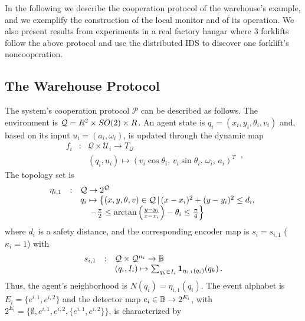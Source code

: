 \documentclass[journal, onecolumn, 12pt]{styles/IEEEtran}
\begin{document}
In the following we describe the cooperation protocol of the warehouse's example, and we exemplify the construction of the local monitor and of its operation. We also present results from experiments in a real factory hangar where $3$ forklifts follow the above protocol and use the distributed IDS to discover one forklift's noncooperation.

\subsection{The Warehouse Protocol}

The system's cooperation protocol $\mathcal{P}$ can be described as
follows. The environment is $\mathcal{Q} = R^2 \times SO(2) \times R$. An agent
state is $q_i = (x_i, y_i, \theta_i, v_i)$ and, based on its
input $u_i=(a_i, \omega_i)$, is updated through the dynamic map
\begin{equation*}
\label{eq:example:dynamics}
\begin{array}{rcl}
f_i & : & \mathcal{Q} \times \mathcal{U}_i \rightarrow T_\mathcal{Q} \\
& & (q_i, u_i) \mapsto \left(v_i \cos \theta_i, \, v_i \sin \theta_i, \,\omega_i , \, a_i \right)^T
\end{array} \, ,
\end{equation*}
The topology set is 
\begin{equation*}
\begin{array}{rcl}
\eta_{i,1} & : & \mathcal{Q} \rightarrow 2^{\mathcal{Q}} \\
& & q_i \mapsto \left\lbrace (x,y,\theta, v) \in \mathcal{Q} \, | \, (x-x_i)^2+(y-y_i)^2 \leq d_i, \right. \\
& & \;\;\;\; \left. -\frac{\pi}{2}  \leq \arctan\left(\frac{y-y_i}{x-x_i}\right)-\theta_i \leq \frac{\pi}{4} \right\rbrace
\end{array}
\end{equation*}
where $d_i$ is a safety distance, and the corresponding encoder map is $s_i = s_{i,1}$ ($\kappa_i=1$) with 
\begin{equation*}
\begin{array}{rcl}
s_{i,1} & : & \mathcal{Q} \times \mathcal{Q}^{n_i} \rightarrow \Bbb{B} \\
& & (q_i, I_i) \mapsto \sum_{q_k \in I_i} {\bf 1}_{\eta_{i,1}(q_i)}(q_k) \, . 
\end{array}
\end{equation*}
Thus, the agent's neighborhood is $N(q_i) = \eta_{i,1}(q_i)$. The event alphabet is $E_i = \{e^{i,1}, e^{i,2}\}$ and the detector map $e_i \in \Bbb{B} \rightarrow 2^{E_i}$, with $2^{E_i} = \{\emptyset, e^{i,1}, e^{i,2}, \{e^{i,1}, e^{i,2}\}\}$, is characterized by
\end{document}
